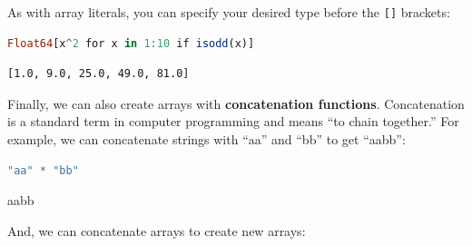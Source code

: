 \documentclass[
  notoc %
]{tufte-book}
\newcommand{\passthrough}[1]{#1}
\begin{document}
As with array literals, you can specify your desired type before the
\passthrough{\lstinline![]!} brackets:

\begin{lstlisting}[language=Julia]
Float64[x^2 for x in 1:10 if isodd(x)]
\end{lstlisting}

\begin{lstlisting}[language=Output]
[1.0, 9.0, 25.0, 49.0, 81.0]
\end{lstlisting}

Finally, we can also create arrays with \textbf{concatenation
functions}. Concatenation is a standard term in computer programming and
means ``to chain together.'' For example, we can concatenate strings
with ``aa'' and ``bb'' to get ``aabb'':

\begin{lstlisting}[language=Julia]
"aa" * "bb"
\end{lstlisting}

aabb

And, we can concatenate arrays to create new arrays:
\end{document}
